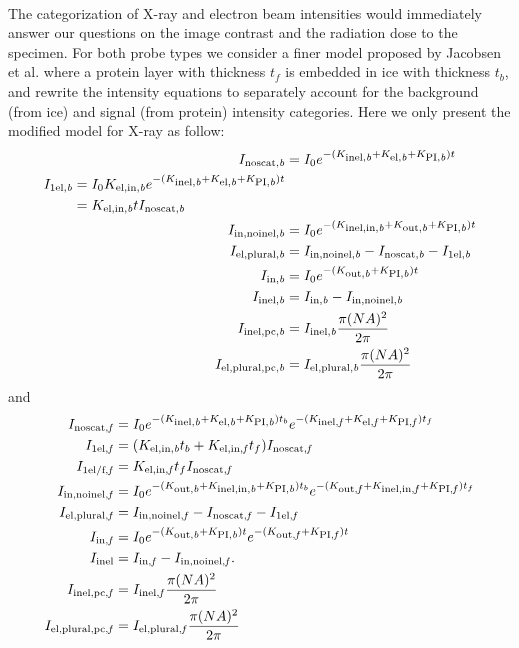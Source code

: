 \documentclass[]{article}
\newcommand\nt{\textup{\scriptsize{0}}}
\newcommand\inel{\textup{\scriptsize{inel}}}
\newcommand\elb{\textup{\scriptsize{el,\textit b}}}
\newcommand\inelb{\textup{\scriptsize{inel,\textit b}}}
\newcommand\elinb{\textup{\scriptsize{el,in,\textit b}}}
\newcommand\inelinb{\textup{\scriptsize{inel,in,\textit b}}}
\newcommand\outb{\textup{\scriptsize{out,\textit b}}}
\newcommand\PIb{\textup{\scriptsize{PI,\textit b}}}
\newcommand\noscatb{\textup{\scriptsize{noscat,\textit b}}}
\newcommand\selb{\textup{\scriptsize{1el,\textit b}}}
\newcommand\elplb{\textup{\scriptsize{el,plural,\textit b}}}
\newcommand\innoinelb{\textup{\scriptsize{in,noinel,\textit b}}}
\newcommand\inelpcb{\textup{\scriptsize{inel,pc,\textit b}}}
\newcommand\elplpcb{\textup{\scriptsize{el,plural,pc,\textit b}}}
\newcommand\inb{\textup{\scriptsize{in,\textit b}}}
\newcommand\elf{\textup{\scriptsize{el,\textit f}}}
\newcommand\inelf{\textup{\scriptsize{inel,\textit f}}}
\newcommand\elinf{\textup{\scriptsize{el,in,\textit f}}}
\newcommand\inelinf{\textup{\scriptsize{inel,in,\textit f}}}
\newcommand\outf{\textup{\scriptsize{out,\textit f}}}
\newcommand\PIf{\textup{\scriptsize{PI,\textit f}}}
\newcommand\noscatf{\textup{\scriptsize{noscat,\textit f}}}
\newcommand\self{\textup{\scriptsize{1el,\textit f}}}
\newcommand\selff{\textup{\scriptsize{1el/f,\textit f}}}
\newcommand\elplf{\textup{\scriptsize{el,plural,\textit f}}}
\newcommand\innoinelf{\textup{\scriptsize{in,noinel,\textit f}}}
\newcommand\inelpcf{\textup{\scriptsize{inel,pc,\textit f}}}
\newcommand\elplpcf{\textup{\scriptsize{el,plural,pc,\textit f}}}
\newcommand\inff{\textup{\scriptsize{in,\textit f}}}
\begin{document}
\paragraph{} The categorization of X-ray and electron beam intensities would immediately answer our questions on the image contrast and the radiation dose to the specimen. For both probe types we consider a finer model proposed by Jacobsen et al. \cite{Jacobsen:1998vj} where a protein layer with thickness $t_f$ is embedded in ice with thickness $t_b$, and rewrite the intensity equations to separately account for the background (from ice) and signal (from protein) intensity categories. Here we only present the modified model for X-ray as follow:
\begin{align}
I_{\noscatb} &= I_{\nt}e^{-(K_{\inelb}+K_{\elb}+K_{\PIb})t}
\label{xb1} \\
\begin{split}
\label{xb2}
I_{\selb} &= I_{\nt}K_{\elinb}e^{-(K_{\inelb}+K_{\elb}+K_{\PIb})t} \\ 
	&= K_{\elinb}t I_{\noscatb}
\end{split} \\
I_{\innoinelb} &= I_{\nt}e^{-(K_{\inelinb}+K_{\outb}+K_{\PIb})t}
\label{xb3} \\
I_{\elplb} &= I_{\innoinelb} - I_{\noscatb} - I_{\selb}
\label{xb4} \\
I_{\inb} &= I_{\nt}e^{-(K_{\outb}+K_{\PIb})t} 
\label{xb5} \\
I_{\inelb} &= I_{\inb} - I_{\innoinelb}
\label{xb7} \\
I_{\inelpcb} &= I_{\inelb} \frac{\pi(NA)^2}{2\pi} \\
I_{\elplpcb} &= I_{\elplb} \frac{\pi(NA)^2}{2\pi}
\end{align} %
and
\begin{align}
I_{\noscatf} &= I_{\nt}e^{-(K_{\inelb}+K_{\elb}+K_{\PIb})t_b}e^{-(K_{\inelf}+K_{\elf}+K_{\PIf})t_f}
\label{xf1} \\
I_{\self} &= (K_{\elinb}t_b + K_{\elinf}t_f) I_{\noscatf}
\label{xf2} \\
I_{\selff} &= K_{\elinf}t_f I_{\noscatf}
\label{xf2.5} \\
I_{\innoinelf} &= I_{\nt} e^{-(K_{\outb}+K_{\inelinb}+K_{\PIb})t_b} e^{-(K_{\outf}+K_{\inelinf}+K_{\PIf})t_f}
\label{xf3} \\
I_{\elplf} &= I_{\innoinelf} - I_{\noscatf} - I_{\self}
\label{xf4} \\
I_{\inff} &= I_{\nt}e^{-(K_{\outb}+K_{\PIb})t}e^{-(K_{\outf}+K_{\PIf})t}
\label{xb5} \\
I_{\inel} &= I_{\inff} - I_{\innoinelf}.
\label{xf7} \\
I_{\inelpcf} &= I_{\inelf} \frac{\pi(NA)^2}{2\pi} \\
I_{\elplpcf} &= I_{\elplf} \frac{\pi(NA)^2}{2\pi} 
\end{align} %
\end{document}
